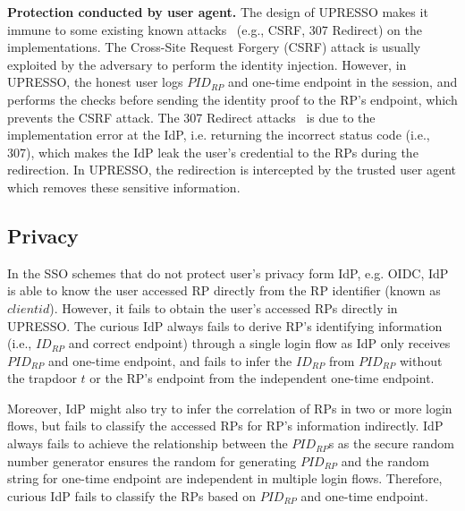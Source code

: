 \vspace{1mm}\noindent\textbf{Protection conducted by user agent.} The design of UPRESSO makes it immune to some existing known attacks~\cite{FettKS16} (e.g., CSRF, 307 Redirect) on the implementations. The Cross-Site Request Forgery (CSRF) attack is  usually exploited by the adversary to perform the identity injection. However, in UPRESSO, the honest user logs  $PID_{RP}$ and one-time endpoint in the session,  and performs the checks before sending the identity proof to the RP's endpoint, which prevents the CSRF attack. The 307 Redirect attacks~\cite{FettKS16} is due to the implementation error at the IdP, i.e. returning the incorrect status code (i.e., 307), which makes the IdP leak the user's credential to the RPs during the redirection. In UPRESSO, the redirection is intercepted by the trusted user agent which removes these sensitive information. 

\subsection{Privacy}
\label{subsec:privacy}
In the SSO schemes that do not protect user's privacy form IdP, e.g. OIDC, IdP is able to know the user accessed RP directly from the RP identifier (known as $client id$). However, it fails to obtain the user's accessed RPs directly in UPRESSO. The curious IdP always fails to derive RP's identifying information (i.e., $ID_{RP}$ and correct endpoint) through a single login flow as IdP only receives $PID_{RP}$ and one-time endpoint, and fails to infer the $ID_{RP}$ from $PID_{RP}$ without the  trapdoor $t$
or the RP's endpoint from the independent one-time endpoint.

Moreover, IdP might also try to infer the correlation of RPs in two or more login flows, but fails to classify the accessed RPs for RP's information indirectly. IdP always fails to achieve the relationship between the $PID_{RP}$s as the secure random number generator ensures the random for generating $PID_{RP}$ and the random string for one-time endpoint are independent in multiple login flows. Therefore, curious IdP fails to classify the RPs based on $PID_{RP}$ and one-time endpoint.

